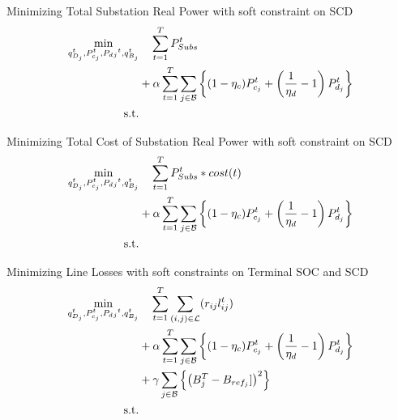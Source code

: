Minimizing Total Substation Real Power with soft constraint on SCD
\begin{gather}
	\begin{align}
		\min_{
		\substack{
		q_{D_j}^t, P_{c_j}^t, P_d{_j}^t, q_{B_j}^t}
		} 
		\vspace{-15ex} %
		& \quad
		\sum_{t = 1}^{T} P_{Subs}^t \\
		&+ \alpha \sum_{t = 1}^{T} \sum_{j \in \mathcal{B}} \left\{ (1- \eta_c)P_{c_j}^t + \left(\frac{1}{\eta_d}-1\right) P_{d_j}^t \right\} \nonumber\\
		\text{s.t.} & {}\nonumber
	\end{align}
\end{gather}

Minimizing Total Cost of Substation Real Power with soft constraint on SCD
\begin{gather}
	\begin{align}
		\min_{
		\substack{
		q_{D_j}^t, P_{c_j}^t, P_d{_j}^t, q_{B_j}^t}
		} 
		\vspace{-15ex} %
		& \quad
		\sum_{t = 1}^{T} P_{Subs}^t*cost(t) \\
		&+ \alpha \sum_{t = 1}^{T} \sum_{j \in \mathcal{B}} \left\{ (1- \eta_c)P_{c_j}^t + \left(\frac{1}{\eta_d}-1\right) P_{d_j}^t \right\} \nonumber\\
		\text{s.t.} & {}\nonumber
	\end{align}
\end{gather}

Minimizing Line Losses with soft constraints on Terminal SOC and SCD
\begin{gather}
	\begin{align}
		\min_{
		\substack{
		q_{D_j}^t, P_{c_j}^t, P_d{_j}^t, q_{B_j}^t}
		} 
		\vspace{-15ex} %
		& \quad
		\sum_{t = 1}^{T} \sum_{(i, j) \in \mathcal{L}} (r_{ij}l_{ij}^t) \\
		&+ \alpha \sum_{t = 1}^{T} \sum_{j \in \mathcal{B}} \left\{ (1- \eta_c)P_{c_j}^t + \left(\frac{1}{\eta_d}-1\right) P_{d_j}^t \right\} \nonumber\\
		&+ \gamma \sum_{j \in \mathcal{B}} \left\{ \left(B^{T}_{j} - B_{ref_{j}}]\right)^2\right\} \nonumber\\
		\text{s.t.} & {}\nonumber
	\end{align}
\end{gather}

